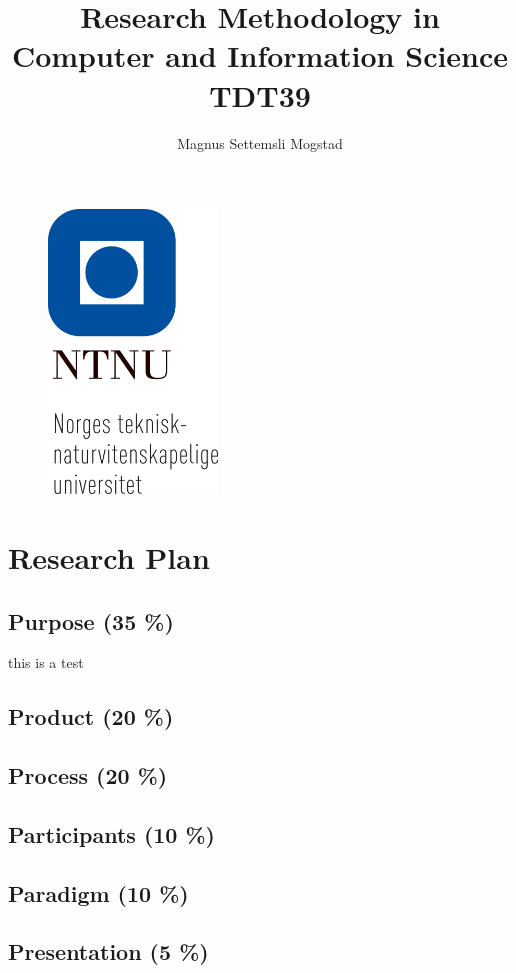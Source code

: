 \documentclass[12pt,runningheads]{article}
\begin{document}
\title{Research Methodology in Computer and Information Science \\ \small TDT39}
\author{Magnus Settemsli Mogstad}
\date{\vspace{-5ex}}
\maketitle
\begin{figure}[h!]
	\centering
    \includegraphics[width=0.4\textwidth]{ntnu_hele_navnet_staaende_bm.png}
\end{figure}

\pagebreak


\section*{Research Plan}

\subsection*{Purpose (35 \%)}
this is a test
\subsection*{Product (20 \%)}
\subsection*{Process (20 \%)}
\subsection*{Participants (10 \%)}
\subsection*{Paradigm (10 \%)}
\subsection*{Presentation (5 \%)}





\printbibliography
\end{document}
